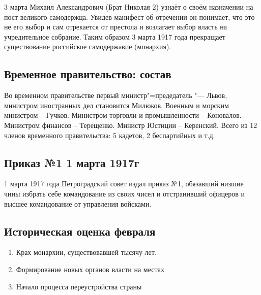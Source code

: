 3 марта Михаил Александрович (Брат Николая 2) узнаёт о своём назначении на пост великого самодержца. Увидев манифест об отречении он понимает, что это не его выбор и сам отрекается от престола и возлагает выбор власть на учредительное собрание. Таким образом 3 марта 1917 года прекращает существование российское самодержавие (монархия).

\subsection{Временное правительство: состав}

Во временном правительстве первый министр"=предедатель "--- Львов, министром иностранных дел становится Милюков. Военным и морским министром – Гучков. Министром торговли и промышленности – Коновалов. Министром финансов – Терещенко. Министр Юстиции – Керенский. Всего из 12 членов временного правительства: 5 кадетов, 2 беспартийных и т.д.

\subsection{Приказ №1 1 марта 1917г}

1 марта 1917 года Петроградский совет издал приказ №1, обязавший низшие чины избрать себе командование из своих чисел и отстранивший офицеров и высшее командование от управления войсками.

\subsection{Историческая оценка февраля}

\begin{enumerate}
    \item Крах монархии, существовавшей тысячу лет. \\
    \item Формирование новых органов власти на местах \\
    \item Начало процесса переустройства страны
\end{enumerate}
